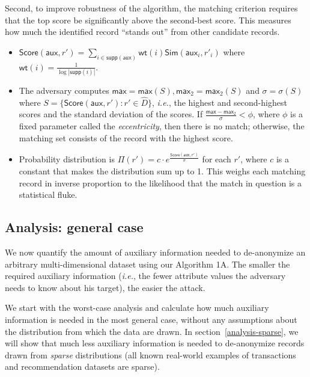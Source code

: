 \documentclass[11pt]{article}
\newcommand{\ie}{\emph{i.e.}}
\newcommand{\Sim}{\textsf{Sim}}
\newcommand{\aux}{\textsf{aux}}
\newcommand{\wt}{\textsf{wt}}
\newcommand{\maxx}{\textsf{max}}
\newcommand{\supp}{\textsf{supp}}
\newcommand{\score}{\textsf{Score}}
\begin{document}
Second, to improve robustness of the algorithm, the matching criterion
requires that the top score be significantly above the second-best score.
This measures how much the identified record ``stands out'' from other
candidate records.

\begin{itemize}

\item
$\score(\aux,r') =  \sum_{i \in \supp(\aux)} \wt(i) \Sim(\aux_i, r'_i)$
where $\wt(i) = \frac 1 {\log |\supp(i)|}$.

\item
The adversary computes
$\maxx = \maxx(S), \maxx_2 = \maxx_2(S)$ and
$\sigma = \sigma(S)$ where $S = \{\score(\aux, r'): r' \in {\hat D}\}$,
\ie, the highest and second-highest scores and the standard deviation
of the scores.
If $\frac{\maxx-\maxx_2}\sigma < \phi$, where $\phi$ is a fixed parameter 
called the \emph{eccentricity},
then there is no match; otherwise, the matching set consists of the
record with the highest score.

\item
Probability distribution is 
$\Pi(r') = c \cdot e^{\frac{\score(\aux, r')}\sigma}$ for each $r'$,
where $c$ is a constant that makes the distribution sum up to 1.
This weighs each matching record in inverse proportion to the likelihood
that the match in question is a statistical fluke.

\end{itemize}


\subsection{Analysis: general case}
\label{analysis-general}

We now quantify the amount of auxiliary information needed to de-anonymize
an arbitrary multi-dimensional dataset using our Algorithm 1A.  The
smaller the required auxiliary information (\ie, the fewer attribute
values the adversary needs to know about his target), the easier the
attack.

We start with the worst-case analysis and calculate how much
auxiliary information is needed in the most general case, without
any assumptions about the distribution from which the data are drawn.
In section~\ref{analysis-sparse}, we will show that much less auxiliary
information is needed to de-anonymize records drawn from \emph{sparse}
distributions (all known real-world examples of transactions and
recommendation datasets are sparse).
\end{document}

